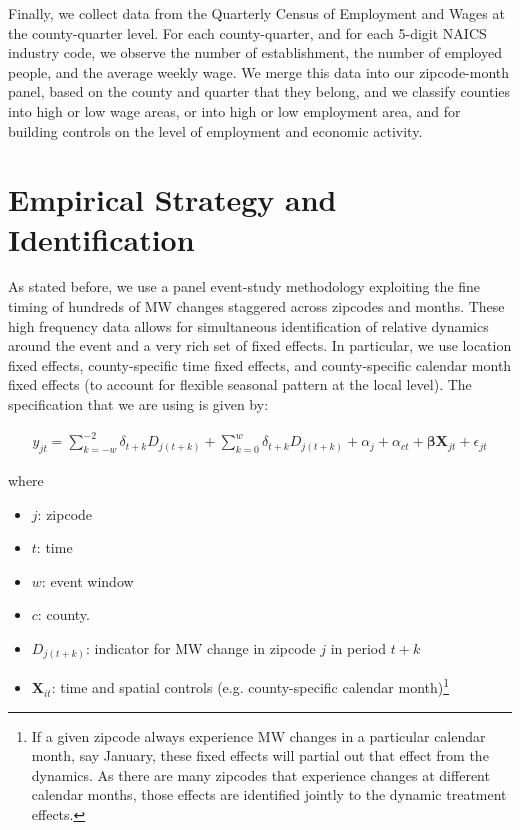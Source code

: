 \documentclass{article}
\begin{document}
Finally, we collect data from the Quarterly Census of Employment and Wages at the county-quarter level. For each county-quarter, and for each 5-digit NAICS industry code, we observe the number of establishment, the number of employed people, and the average weekly wage. We merge this data into our zipcode-month panel, based on the county and quarter that they belong, and we classify counties into high or low wage areas, or into high or low employment area, and for building controls on the level of employment and economic activity. 

\section{Empirical Strategy and Identification}

As stated before, we use a panel event-study methodology exploiting the fine timing of hundreds of MW changes staggered across zipcodes and months. These high frequency data allows for simultaneous identification of relative dynamics around the event and a very rich set of fixed effects. In particular, we use location fixed effects, county-specific time fixed effects, and county-specific calendar month fixed effects (to account for flexible seasonal pattern at the local level). The specification that we are using is given by:

\begin{equation}
\begin{aligned}
    y_{jt} = \sum\limits_{k = -w}^{-2}\delta_{t + k} D_{j(t+k)} + \sum\limits_{k = 0}^{w}\delta_{t + k} D_{j(t + k)} + \alpha_{j} + \alpha_{ct} + \boldsymbol{\beta} \boldsymbol{X}_{jt} +\epsilon_{jt} 
\end{aligned}   
\end{equation}

where

\begin{itemize}
    \item $j$: zipcode
    \item $t$: time
    \item $w$: event window
    \item $c$: county.
    \item $D_{j (t + k)}$: indicator for MW change in zipcode $j$ in period $t+k$
    \item $\boldsymbol{X}_{it}$: time and spatial controls (e.g. county-specific calendar month)\footnote{If a given zipcode always experience MW changes in a particular calendar month, say January, these fixed effects will partial out that effect from the dynamics. As there are many zipcodes that experience changes at different calendar months, those effects are identified jointly to the dynamic treatment effects. }
\end{itemize}
\end{document}
